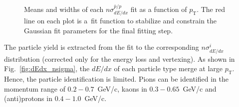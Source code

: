\begin{figure}[h!]
\begin{subfigure}{.32\textwidth}
		\end{subfigure}
	\caption{Means and widths  of each $n\sigma^{\bar{p}/p}_{dE/dx}$ fit as a function of $p_\textrm{T}$.  The red line on each plot is a~fit function to stabilize and constrain the Gaussian fit parameters for the final fitting step.}
	\label{fig:dEdx_fit_parameters_P}
	
\end{figure}


The particle yield is extracted from the fit to the corresponding
$n\sigma^{i}_{dE/dx}$  distribution (corrected only for the energy loss and vertexing). As shown in Fig.~\ref{fig:dEdx_nsigma}, the $dE/dx$ of each particle type merge at large $p_\textrm{T}$. Hence, the particle identification is limited. Pions can be identified
in the momentum range of $0.2-0.7$~GeV/c, kaons in
$0.3-0.65$~GeV/c and (anti)protons in $0.4-1.0$~GeV/c. 
